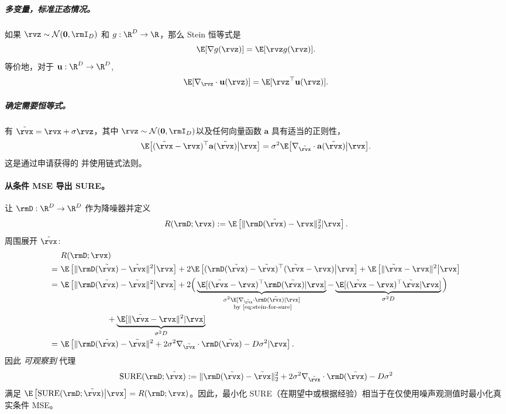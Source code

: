 \subparagraph{多变量，标准正态情况。}
如果 $\rvz \sim \mathcal{N}(\mathbf{0},\rmI_D)$ 和 $g:\R^D \to \R$，那么 Stein 恒等式是
\[
\E[\nabla g(\rvz)]  =  \E[\rvz g(\rvz)].
\]
等价地，对于 $\mathbf{u}:\R^D \to \R^D$,
\begin{align}\label{eq:stein-multi}
    \E[ \nabla_{\rvz} \cdot\mathbf{u}(\rvz)]  =  \E[\rvz^\top \mathbf{u}(\rvz)] .
\end{align}


\subparagraph{确定需要恒等式。}
有 $\tilde{\rvx}=\rvx+\sigma\rvz$，其中 $\rvz \sim \mathcal{N}(\mathbf{0},\rmI_D)$以及任何向量函数 $\mathbf{a}$ 具有适当的正则性，
\begin{align}\label{eq:stein-for-sure}
    \E\big[(\tilde{\rvx}-\rvx)^\top \mathbf{a}(\tilde{\rvx})  \big|  \rvx\big]
 =  \sigma^2 \E\big[ \nabla_{\tilde{\rvx}} \cdot\mathbf{a}(\tilde{\rvx})  \big|  \rvx\big].
\end{align}
这是通过申请获得的  并使用链式法则。

\paragraph{从条件 MSE 导出 SURE。}
让 $\rmD:\R^D \to \R^D$ 作为降噪器并定义
\[
R(\rmD;\rvx):=\E \left[\|\rmD(\tilde{\rvx})-\rvx\|_2^2| \rvx\right].
\]
周围展开 $\tilde{\rvx}$:
\[
\begin{aligned}
&~R(\rmD;\rvx) \\
=&~\E \left[\|\rmD(\tilde{\rvx})-\tilde{\rvx}\|^2  \big|  \rvx\right]
+2 \E \left[(\rmD(\tilde{\rvx})-\tilde{\rvx})^\top(\tilde{\rvx}-\rvx)  \big|  \rvx\right]
+\E \left[\|\tilde{\rvx}-\rvx\|^2  \big|  \rvx\right] \\
=&~\E \left[\|\rmD(\tilde{\rvx})-\tilde{\rvx}\|^2  \big|  \rvx\right]
+2\Big(\underbrace{\E[(\tilde{\rvx}-\rvx)^\top \rmD(\tilde{\rvx})|\rvx]}_{\substack{\sigma^2 \E[ \nabla_{\tilde{\rvx}} \cdot\rmD(\tilde{\rvx})|\rvx] \\  \text{ by \Cref{eq:stein-for-sure}}
}}
-\underbrace{\E[(\tilde{\rvx}-\rvx)^\top \tilde{\rvx}|\rvx]}_{ \sigma^2 D}\Big)
\\&\qquad\qquad\qquad+\underbrace{\E[\|\tilde{\rvx}-\rvx\|^2|\rvx]}_{ \sigma^2 D} \\
=&~\E \left[\|\rmD(\tilde{\rvx})-\tilde{\rvx}\|^2
+2\sigma^2  \nabla_{\tilde{\rvx}} \cdot\rmD(\tilde{\rvx})
-D\sigma^2 | \rvx\right].
\end{aligned}
\]
因此 \emph{可观察到} 代理
\[
\mathrm{SURE}(\rmD;\tilde{\rvx})
:= \|\rmD(\tilde{\rvx})-\tilde{\rvx}\|_2^2
+2\sigma^2  \nabla_{\tilde{\rvx}} \cdot\rmD(\tilde{\rvx})
-D\sigma^2
\]
满足 $\E \left[\mathrm{SURE}(\rmD;\tilde{\rvx}) \big| \rvx\right]=R(\rmD;\rvx)$。因此，最小化 SURE（在期望中或根据经验）相当于在仅使用噪声观测值时最小化真实条件 MSE。


